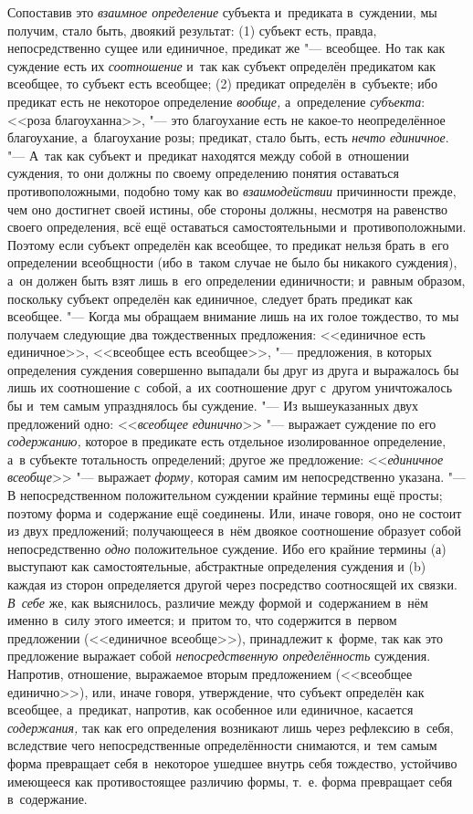 Сопоставив это {\em взаимное определение} субъекта и~предиката в~суждении, мы
получим, стало быть, двоякий результат: (1) субъект есть, правда,
непосредственно сущее или единичное, предикат же "--- всеобщее. Но так как
суждение есть их {\em соотношение} и~так как субъект определён предикатом как
всеобщее, то субъект есть всеобщее; (2) предикат определён в~субъекте; ибо
предикат есть не некоторое определение {\em вообще,} а~определение
{\em субъекта}: <<роза благоуханна>>, "--- это благоухание есть не какое-то
неопределённое благоухание, а~благоухание розы; предикат, стало быть, есть
{\em нечто единичное}. "--- А~так как субъект и~предикат находятся между собой
в~отношении суждения, то они должны по своему определению понятия оставаться
противоположными, подобно тому как во {\em взаимодействии}
причинности прежде, чем оно достигнет своей истины, обе
стороны должны, несмотря на равенство своего определения, всё ещё
оставаться самостоятельными и~противоположными. Поэтому если субъект
определён как всеобщее, то предикат нельзя брать в~его определении
всеобщности (ибо в~таком случае не было бы никакого
суждения), а~он должен быть взят лишь в~его определении
единичности; и~равным образом, поскольку субъект определён как единичное,
следует брать предикат как всеобщее. "--- Когда мы обращаем
внимание лишь на их голое тождество, то мы получаем следующие два
тождественных предложения:\label{bkm:bm35a}
<<единичное есть единичное>>, <<всеобщее есть всеобщее>>, "--- предложения,
в которых определения суждения совершенно выпадали бы друг из друга и
выражалось бы лишь их соотношение с~собой, а~их соотношение друг с~другом
уничтожалось бы и~тем самым упразднялось бы суждение. "--- Из
вышеуказанных двух предложений одно: <<{\em всеобщее единично}>> "---
выражает суждение по его {\em содержанию,} которое
в предикате есть отдельное изолированное определение, а~в субъекте
тотальность определений; другое же предложение:
<<{\em единичное всеобще}>> "--- выражает {\em форму,}
которая самим им непосредственно указана. "---
В непосредственном положительном суждении крайние термины
ещё просты; поэтому форма и~содержание ещё соединены. Или, иначе говоря,
оно не состоит из двух предложений; получающееся в~нём двоякое соотношение
образует собой непосредственно {\em одно} положительное
суждение. Ибо его крайние термины (а) выступают как самостоятельные,
абстрактные определения суждения и (b) каждая из сторон определяется другой
через посредство соотносящей их связки. {\em В~себе} же, как
выяснилось, различие между формой и~содержанием в~нём именно в~силу этого
имеется; и~притом то, что содержится в~первом предложении (<<единичное
всеобще>>), принадлежит к~форме, так как это предложение выражает собой
{\em непосредственную определённость} суждения. Напротив, отношение,
выражаемое вторым предложением (<<всеобщее единично>>), или, иначе говоря,
утверждение, что субъект определён как всеобщее, а~предикат, напротив, как
особенное или единичное, касается {\em содержания,} так как его определения
возникают лишь через рефлексию в~себя, вследствие чего непосредственные
определённости снимаются, и~тем самым форма превращает себя в~некоторое ушедшее
внутрь себя тождество, устойчиво имеющееся как противостоящее различию формы,
т.~е. форма превращает себя в~содержание.

